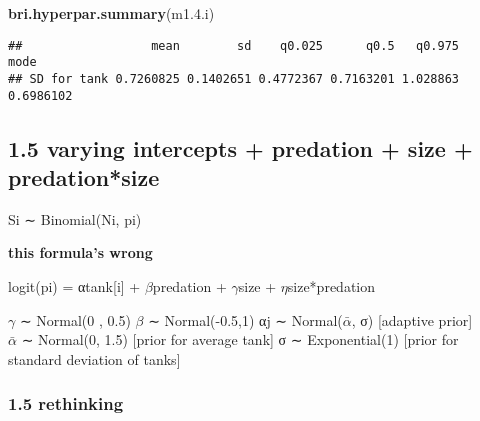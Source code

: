 \documentclass[
]{article}
\newenvironment{Shaded}{\begin{snugshade}}{\end{snugshade}}
\newcommand{\FloatTok}[1]{\textcolor[rgb]{0.00,0.00,0.81}{#1}}
\newcommand{\KeywordTok}[1]{\textcolor[rgb]{0.13,0.29,0.53}{\textbf{#1}}}
\newcommand{\NormalTok}[1]{#1}
\begin{document}
\begin{Shaded}
\begin{Highlighting}[]
\KeywordTok{bri.hyperpar.summary}\NormalTok{(m1.}\FloatTok{4.}\NormalTok{i)}
\end{Highlighting}
\end{Shaded}

\begin{verbatim}
##                  mean        sd    q0.025      q0.5   q0.975      mode
## SD for tank 0.7260825 0.1402651 0.4772367 0.7163201 1.028863 0.6986102
\end{verbatim}

\hypertarget{varying-intercepts-predation-size-predationsize}{%
\subsection{1.5 varying intercepts + predation + size +
predation*size}\label{varying-intercepts-predation-size-predationsize}}

Si ∼ Binomial(Ni, pi)

\textbf{this formula's wrong}

logit(pi) = αtank{[}i{]} + \(\beta\)predation + \(\gamma\)size +
\(\eta\)size*predation

\(\gamma\) ∼ Normal(0 , 0.5) \(\beta\) ∼ Normal(-0.5,1) αj ∼
Normal(\(\bar{\alpha}\), σ) {[}adaptive prior{]}\\
\(\bar{\alpha}\) ∼ Normal(0, 1.5) {[}prior for average tank{]} σ ∼
Exponential(1) {[}prior for standard deviation of tanks{]}

\hypertarget{rethinking-4}{%
\subsubsection{1.5 rethinking}\label{rethinking-4}}
\end{document}
